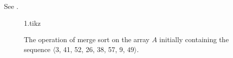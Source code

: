 See .
\begin{figure}[htb]
    {1.tikz}
    \caption{The operation of merge sort on the array $A$ initially containing the sequence $\langle3$, 41, 52, 26, 38, 57, 9, $49\rangle$.} \label{fig:2.3-1}
\end{figure}
